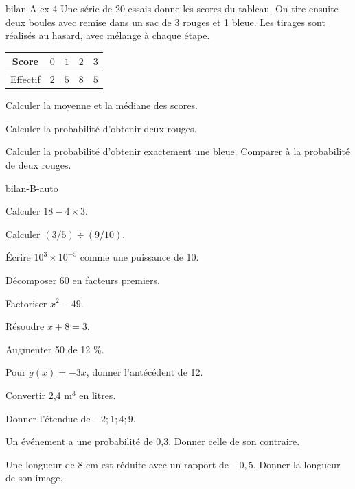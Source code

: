 \begin{blocEdition}{bilan-A-ex-4}
Une série de 20 essais donne les scores du tableau. On tire ensuite deux boules avec remise dans un sac de 3 rouges et 1 bleue. Les tirages sont réalisés au hasard, avec mélange à chaque étape.\begin{center}\renewcommand{\arraystretch}{1.35}\begin{tabular}{c|cccc}\toprule
Score & $0$ & $1$ & $2$ & $3$\\\midrule
Effectif & $2$ & $5$ & $8$ & $5$\\
\bottomrule\end{tabular}\end{center}\begin{questions}
\item Calculer la moyenne et la médiane des scores.
\item Calculer la probabilité d’obtenir deux rouges.
\item Calculer la probabilité d’obtenir exactement une bleue. Comparer à la probabilité de deux rouges.
\end{questions}\par{}\label{fig-bilan-A-ex-4}

\end{blocEdition}
\begin{blocEdition}{bilan-B-auto}
\begin{questions}
\item Calculer $18-4\times3$.
\item Calculer $(3/5)\div(9/10)$.
\item Écrire $10^3\times10^{-5}$ comme une puissance de 10.
\item Décomposer 60 en facteurs premiers.
\item Factoriser $x^2-49$.
\item Résoudre $x+8=3$.
\item Augmenter 50 de 12 \%.
\item Pour $g(x)=-3x$, donner l’antécédent de 12.
\item Convertir 2,4 m$^3$ en litres.
\item Donner l’étendue de $-2;1;4;9$.
\item Un événement a une probabilité de 0,3. Donner celle de son contraire.
\item Une longueur de 8 cm est réduite avec un rapport de $-0{,}5$. Donner la longueur de son image.\end{questions}
\end{blocEdition}
